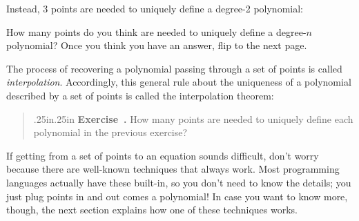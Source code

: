 \documentclass[12 pt]{article}
\newcounter{exercise}[section]
\newenvironment{exercise}{\refstepcounter{exercise}\par\bigskip \begin{quotation}{}{\leftmargin .25in\rightmargin .25in}
    \noindent \textbf{Exercise~\thesection.\theexercise }  \rmfamily}{\end{quotation}\par\bigskip}
\begin{document}
Instead, 3 points are needed to uniquely define a degree-2 polynomial:

\begin{center}
\end{center}

How many points do you think are needed to uniquely define a degree-$n$
polynomial? Once you think you have an answer, flip to the next page.

\newpage
The process of recovering a polynomial passing through a set of points is 
called \emph{interpolation}. Accordingly, this general rule about the 
uniqueness of a polynomial described by a set of points is called the 
interpolation theorem:

\setlength\fboxsep{1em}        
\begin{center}
\end{center}

\begin{exercise}
    How many points are needed to uniquely define each polynomial 
    in the previous exercise?
\end{exercise}

If getting from a set of points to an equation sounds difficult, don't worry because 
there are well-known techniques that always work. Most programming languages 
actually have these built-in, so you don't need to know the details; you just 
plug points in and out comes a polynomial! In case you want to know more, though,
the next section explains how one of these techniques works.
\end{document}

